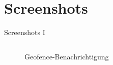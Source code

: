 \documentclass{beamer}
\begin{document}
	\section{Screenshots}
	\begin{frame}{Screenshots I}
		\begin{columns}[onlytextwidth]
			
			\begin{column}{0.5\textwidth}
				\centering
				\begin{figure}
					\caption{Geofence-Benachrichtigung}
				\end{figure}
			\end{column}
			

\end{columns}
\end{frame}
\end{document}
